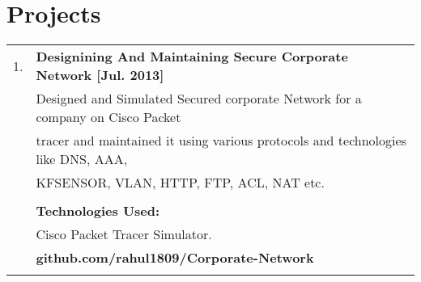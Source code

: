 \documentclass[a4paper,10pt]{article}
\begin{document}
\section{Projects}
\begin{tabular}{rl}
 \textsc{1.} & {\large\textbf{Designining And Maintaining Secure Corporate Network [Jul. 2013]}}\\ & \textsc Designed and Simulated Secured corporate Network for a company on Cisco Packet\\ & tracer and maintained it using various protocols and technologies like DNS, AAA, \\ & KFSENSOR, VLAN, HTTP, FTP, ACL, NAT etc.\\ & \\ &
 \normalsize\textbf{Technologies Used:}\\ & Cisco Packet Tracer Simulator.\\ &
 \normalsize\textbf{github.com/rahul1809/Corporate-Network}\\ & \\


\end{tabular}
\end{document}
